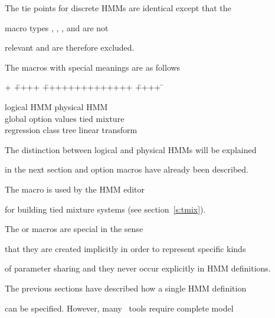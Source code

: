 




\noindent


The tie points for discrete HMMs are identical except that the


macro types , , ,  and  are not


relevant and are therefore excluded.





The macros with special meanings are as follows


\begin{tabbing}


+ \= ++++ \= ++++++++++++++ \= ++++ \=\kill


\>  \>  logical HMM \>  \>  physical HMM \\


\>  \>  global option values \>  \>  tied mixture \\


\>  \>  regression class tree \>  \> linear transform


\end{tabbing}


The distinction between logical and physical HMMs will be explained


in the next section and option macros have already been described.


The  macro is used by the HMM editor 


for building tied mixture systems (see section~\ref{s:tmix}).


The  or  macros are special in the sense


that they are created implicitly in order to represent specific kinds 


of parameter sharing and they never occur explicitly in HMM definitions.










The previous sections have described how a single HMM definition


can be specified.  However, many \HTK\ tools require complete model



